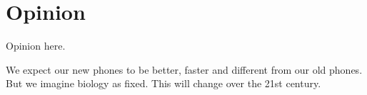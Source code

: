 \section{Opinion}
\label{sec:opinion}

Opinion here.

We expect our new phones to be better, faster and different from our old phones.
But we imagine biology as fixed.
This will change over the 21st century.
